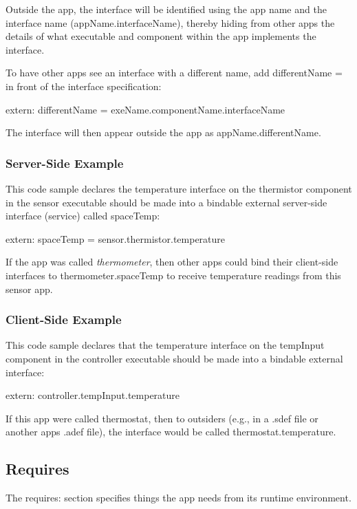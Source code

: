 Outside the app, the interface will be identified using the app name and the interface name ({\ttfamily app\+Name.\+interface\+Name}), thereby hiding from other apps the details of what executable and component within the app implements the interface.

To have other apps see an interface with a different name, add {\ttfamily  different\+Name = } in front of the interface specification\+:

\begin{DoxyVerb}extern:
{
    differentName = exeName.componentName.interfaceName
}
\end{DoxyVerb}


The interface will then appear outside the app as {\ttfamily app\+Name.\+different\+Name}.\hypertarget{def_files_adef_defFilesAdef_externServer}{}\subsubsection{Server-\/\+Side Example}\label{def_files_adef_defFilesAdef_externServer}
This code sample declares the {\ttfamily temperature} interface on the {\ttfamily thermistor} component in the {\ttfamily sensor} executable should be made into a bindable external server-\/side interface (service) called {\ttfamily space\+Temp\+:} 

\begin{DoxyVerb}extern:
{
    spaceTemp = sensor.thermistor.temperature
}
\end{DoxyVerb}


If the app was called {\itshape thermometer}, then other apps could bind their client-\/side interfaces to {\ttfamily thermometer.\+space\+Temp} to receive temperature readings from this sensor app.\hypertarget{def_files_adef_defFilesAdef_externClient}{}\subsubsection{Client-\/\+Side Example}\label{def_files_adef_defFilesAdef_externClient}
This code sample declares that the {\ttfamily temperature} interface on the {\ttfamily temp\+Input} component in the {\ttfamily controller} executable should be made into a bindable external interface\+:

\begin{DoxyVerb}extern:
{
    controller.tempInput.temperature
}
\end{DoxyVerb}


If this app were called thermostat, then to outsiders (e.\+g., in a {\ttfamily }.sdef file or another app\textquotesingle{}s {\ttfamily }.adef file), the interface would be called {\ttfamily thermostat.\+temperature}.\hypertarget{def_files_adef_defFilesAdef_requires}{}\subsection{Requires}\label{def_files_adef_defFilesAdef_requires}
The {\ttfamily requires\+:} section specifies things the app needs from its runtime environment.


